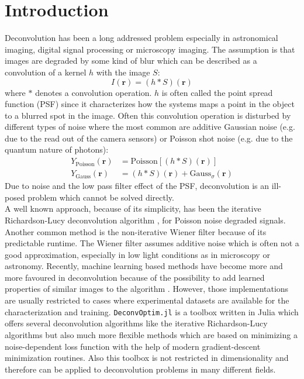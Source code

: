 \documentclass{juliacon}
\begin{document}
\section{Introduction}
Deconvolution has been a long addressed problem especially in astronomical imaging, digital signal processing or microscopy imaging.
The assumption is that images are degraded by some kind of blur which can be described as a convolution of a kernel $h$ with the image $S$:
\begin{equation}
    I(\mathbf r) = (h * S)(\mathbf r)
\end{equation}
where $*$ denotes a convolution operation.
$h$ is often called the point spread function (PSF) since it characterizes how the systems maps a point in the object to a blurred spot 
in the image.
Often this convolution operation is disturbed by different types of noise where the most common are additive Gaussian noise (e.g. due to the read out of the camera sensors) or Poisson shot noise (e.g. due to the quantum nature of photons):
\begin{align}
    Y_{\text{Poisson}}(\mathbf r) &= \text{Poisson}[(h * S)(\mathbf r)]\\
    Y_{\text{Gauss}}(\mathbf r) &= (h * S)(\mathbf r) + \text{Gauss}_{\sigma}(\mathbf r)
\end{align}
Due to noise and the low pass filter effect of the PSF, deconvolution is an ill-posed problem which cannot be solved directly.\\
A well known approach, because of its simplicity, has been the iterative Richardson-Lucy deconvolution algorithm 
\cite{Richardson:72}, \cite{lucy:74} for Poisson noise degraded signals.
Another common method is the non-iterative Wiener filter \cite{wiener2013extrapolation} because of its predictable runtime.
The Wiener filter assumes additive noise which is often not a good approximation, especially in low light conditions as in microscopy or astronomy. 
Recently, machine learning based methods have become more and more favoured in deconvolution because
of the possibility to add learned properties of similar images to the algorithm \cite{Kruse_2017_ICCV}.
However, those implementations are usually restricted to cases where experimental datasets are available for the characterization and training.
\verb|DeconvOptim.jl| is a toolbox written in Julia \cite{bezanson2017julia} which offers several deconvolution algorithms 
like the iterative Richardson-Lucy algorithms but also
much more flexible methods which are based on minimizing a 
noise-dependent loss function with the help of modern gradient-descent minimization routines. 
Also this toolbox is not restricted in dimensionality and therefore can be applied to deconvolution problems in many different fields.
\end{document}
